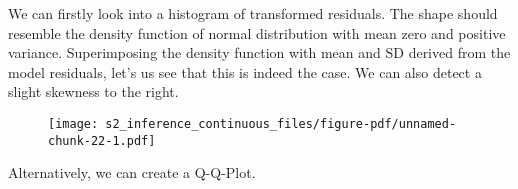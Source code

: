 \documentclass[
  letterpaper,
  DIV=11,
  numbers=noendperiod]{scrreprt}
\newenvironment{Shaded}{\begin{snugshade}}{\end{snugshade}}
\newcommand{\AttributeTok}[1]{\textcolor[rgb]{0.40,0.45,0.13}{#1}}
\newcommand{\DecValTok}[1]{\textcolor[rgb]{0.68,0.00,0.00}{#1}}
\newcommand{\FunctionTok}[1]{\textcolor[rgb]{0.28,0.35,0.67}{#1}}
\newcommand{\NormalTok}[1]{\textcolor[rgb]{0.00,0.23,0.31}{#1}}
\newcommand{\SpecialCharTok}[1]{\textcolor[rgb]{0.37,0.37,0.37}{#1}}
\newcommand{\StringTok}[1]{\textcolor[rgb]{0.13,0.47,0.30}{#1}}
\begin{document}
We can firstly look into a histogram of transformed residuals. The shape
should resemble the density function of normal distribution with mean
zero and positive variance. Superimposing the density function with mean
and SD derived from the model residuals, let's us see that this is
indeed the case. We can also detect a slight skewness to the right.

\begin{Shaded}
\end{Shaded}

\begin{figure}[H]

{\centering \texttt{[image: s2\_inference\_continuous\_files/figure-pdf/unnamed-chunk-22-1.pdf]}

}

\end{figure}

Alternatively, we can create a Q-Q-Plot.
\end{document}
